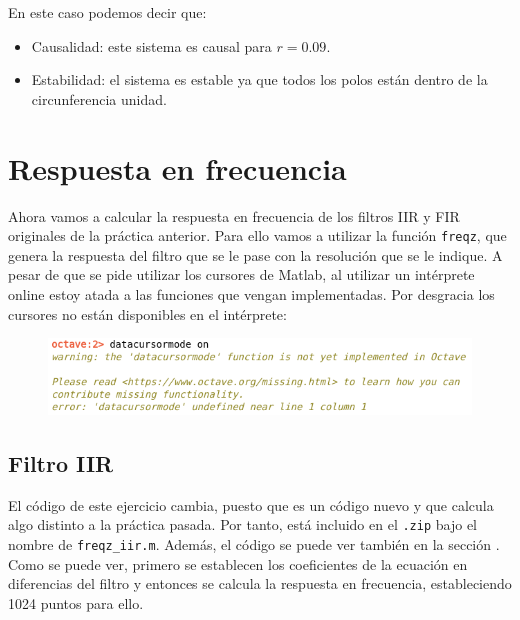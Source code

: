 \documentclass[11pt,a4paper]{article}
\begin{document}
En este caso podemos decir que:

\begin{itemize}
	\item Causalidad: este sistema es causal para $r=0.09$.
	\item Estabilidad: el sistema es estable ya que todos los polos están dentro de la circunferencia unidad.
\end{itemize}
\newpage

\section{Respuesta en frecuencia}

Ahora vamos a calcular la respuesta en frecuencia de los filtros IIR y FIR originales de la práctica anterior. Para ello vamos a utilizar la función \texttt{freqz}, que genera la respuesta del filtro que se le pase con la resolución que se le indique. A pesar de que se pide utilizar los cursores de Matlab, al utilizar un intérprete online estoy atada a las funciones que vengan implementadas. Por desgracia los cursores no están disponibles en el intérprete:

\begin{figure}[H]
	\centering
	\includegraphics[scale=0.5]{img/cursor.png}
\end{figure}

\subsection{Filtro IIR}
El código de este ejercicio cambia, puesto que es un código nuevo y que calcula algo distinto a la práctica pasada. Por tanto, está incluido en el \texttt{.zip} bajo el nombre de \texttt{freqz\_iir.m}. Además, el código se puede ver también en la sección \color{deepred}\color{black}.\\

Como se puede ver, primero se establecen los coeficientes de la ecuación en diferencias del filtro y entonces se calcula la respuesta en frecuencia, estableciendo 1024 puntos para ello.
\end{document}

